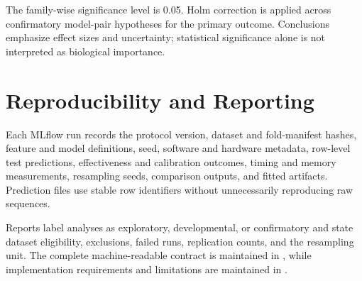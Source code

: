 The family-wise significance level is 0.05. Holm correction is applied across
confirmatory model-pair hypotheses for the primary outcome. Conclusions
emphasize effect sizes and uncertainty; statistical significance alone is not
interpreted as biological importance.

\section{Reproducibility and Reporting}\label{sec:protocol-controls}

Each MLflow run records the protocol version, dataset and fold-manifest hashes,
feature and model definitions, seed, software and hardware metadata, row-level
test predictions, effectiveness and calibration outcomes, timing and memory
measurements, resampling seeds, comparison outputs, and fitted artifacts.
Prediction files use stable row identifiers without unnecessarily reproducing
raw sequences.

Reports label analyses as exploratory, developmental, or confirmatory and state
dataset eligibility, exclusions, failed runs, replication counts, and the
resampling unit. The complete machine-readable contract is maintained in
, while implementation requirements and
limitations are maintained in
.
